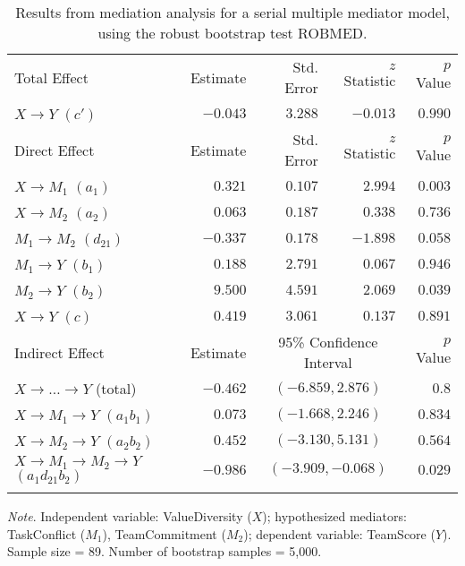 \documentclass{article}\usepackage[]{graphicx}\usepackage[]{xcolor}
\begin{document}
\begin{table}[h!]
\caption{Results from mediation analysis for a serial multiple mediator model, using the robust bootstrap test ROBMED.}
\begin{center}
\begin{tabular}{lrrrr}
\hline\noalign{\smallskip}
Total Effect & Estimate & Std. Error & $z$ Statistic & $p$ Value \\ 
\noalign{\smallskip}\hline\noalign{\smallskip}
$X \rightarrow Y$ $(c')$ & $-0.043$ & $3.288$ & $-0.013$ & $0.990$ \\ 
\noalign{\smallskip}\hline\noalign{\smallskip}
Direct Effect & Estimate & Std. Error & $z$ Statistic & $p$ Value \\ 
\noalign{\smallskip}\hline\noalign{\smallskip}
$X \rightarrow M_{1}$ $(a_{1})$ & $0.321$ & $0.107$ & $2.994$ & $0.003$ \\ 
$X \rightarrow M_{2}$ $(a_{2})$ & $0.063$ & $0.187$ & $0.338$ & $0.736$ \\ 
$M_{1} \rightarrow M_{2}$ $(d_{21})$ & $-0.337$ & $0.178$ & $-1.898$ & $0.058$ \\ 
$M_{1} \rightarrow Y$ $(b_{1})$ & $0.188$ & $2.791$ & $0.067$ & $0.946$ \\ 
$M_{2} \rightarrow Y$ $(b_{2})$ & $9.500$ & $4.591$ & $2.069$ & $0.039$ \\ 
$X \rightarrow Y$ $(c)$ & $0.419$ & $3.061$ & $0.137$ & $0.891$ \\ 
\noalign{\smallskip}\hline\noalign{\smallskip}
Indirect Effect & Estimate & \multicolumn{2}{c}{95\% Confidence Interval} & $p$ Value \\ 
\noalign{\smallskip}\hline\noalign{\smallskip}
$X \rightarrow  \ldots  \rightarrow Y$ (total) & $-0.462$ & \multicolumn{2}{c}{$(-6.859, 2.876)$} & $0.8$ \\ 
$X \rightarrow M_{1} \rightarrow Y$ $(a_{1}b_{1})$ & $0.073$ & \multicolumn{2}{c}{$(-1.668, 2.246)$} & $0.834$ \\ 
$X \rightarrow M_{2} \rightarrow Y$ $(a_{2}b_{2})$ & $0.452$ & \multicolumn{2}{c}{$(-3.130, 5.131)$} & $0.564$ \\ 
$X \rightarrow M_{1} \rightarrow M_{2} \rightarrow Y$ $(a_{1}d_{21}b_{2})$ & $-0.986$ & \multicolumn{2}{c}{$(-3.909, -0.068)$} & $0.029$ \\ 
\noalign{\smallskip}\hline
\end{tabular}
\end{center}
\emph{Note}. Independent variable: ValueDiversity ($X$); hypothesized mediators: TaskConflict ($M_{1}$), TeamCommitment ($M_{2}$); dependent variable: TeamScore ($Y$). Sample size = 89. Number of bootstrap samples = 5,000. 

\end{table}
\end{document}

